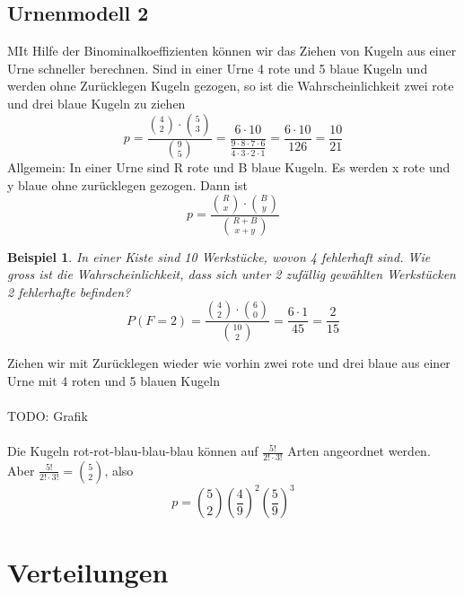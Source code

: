 \documentclass{report}
\newtheorem{myexample}{Beispiel}
\begin{document}
\section{Urnenmodell 2}
MIt Hilfe der Binominalkoeffizienten können wir das Ziehen von Kugeln aus einer Urne schneller berechnen. Sind in einer Urne 4 rote und 5 blaue Kugeln und werden ohne Zurücklegen Kugeln gezogen, so ist die Wahrscheinlichkeit zwei rote und drei blaue Kugeln zu ziehen
\begin{equation}
p = \frac{\binom{4}{2} \cdot \binom{5}{3}}{\binom{9}{5}} = \frac{6 \cdot 10}{\frac{9 \cdot 8 \cdot 7 \cdot 6}{4 \cdot 3 \cdot 2 \cdot 1}} = \frac{6 \cdot 10}{126} = \frac{10}{21}
\end{equation}
Allgemein: In einer Urne sind R rote und B blaue Kugeln. Es werden x rote und y blaue ohne zurücklegen gezogen. Dann ist
\begin{equation}
p = \frac{\binom{R}{x} \cdot \binom{B}{y}}{\binom{R+B}{x+y}}
\end{equation}
\begin{myexample}
In einer Kiste sind 10 Werkstücke, wovon 4 fehlerhaft sind. Wie gross ist die Wahrscheinlichkeit, dass sich unter 2 zufällig gewählten Werkstücken 2 fehlerhafte befinden?
\begin{equation}
P(F=2) = \frac{\binom{4}{2} \cdot \binom{6}{0}}{\binom{10}{2}} = \frac{6 \cdot 1}{45} = \frac{2}{15}
\end{equation}
\end{myexample}
Ziehen wir mit Zurücklegen wieder wie vorhin zwei rote und drei blaue aus einer Urne mit 4 roten und 5 blauen Kugeln
\\\\TODO: Grafik\\\\
Die Kugeln rot-rot-blau-blau-blau können auf $\frac{5!}{2! \cdot 3!}$ Arten angeordnet werden. Aber $\frac{5!}{2! \cdot 3!} = \binom{5}{2}$, also
\begin{equation}
p = \binom{5}{2} \left(\frac{4}{9}\right)^2 \left(\frac{5}{9}\right)^3
\end{equation}

\chapter{Verteilungen}
\end{document}
